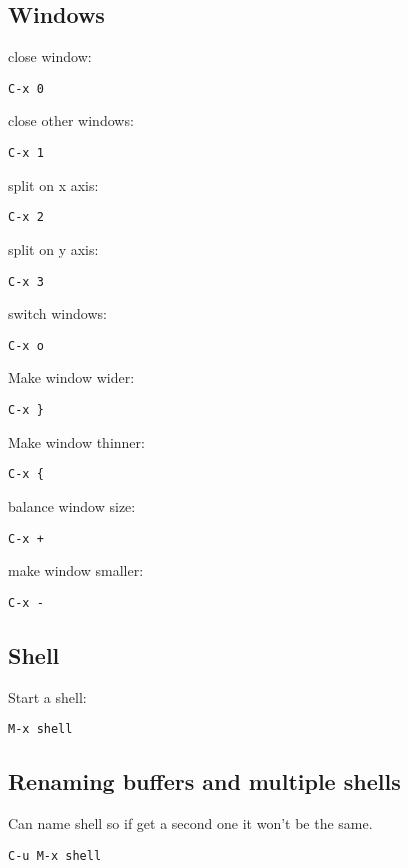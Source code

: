 \subsection{Windows}

close window:
\begin{verbatim}
C-x 0
\end{verbatim}
close other windows:
\begin{verbatim}
C-x 1
\end{verbatim}
split on x axis:
\begin{verbatim}
C-x 2
\end{verbatim}
split on y axis:
\begin{verbatim}
C-x 3
\end{verbatim}
switch windows:
\begin{verbatim}
C-x o
\end{verbatim}
Make window wider:
\begin{verbatim}
C-x }
\end{verbatim}
Make window thinner:
\begin{verbatim}
C-x {
\end{verbatim}
balance window size:
\begin{verbatim}
C-x +
\end{verbatim}
make window smaller:
\begin{verbatim}
C-x -
\end{verbatim}

\subsection{Shell}

Start a shell:

\begin{verbatim}
M-x shell
\end{verbatim}

\subsection{Renaming buffers and multiple shells}

Can name shell so if get a second one it won't be the same.

\begin{verbatim}
C-u M-x shell
\end{verbatim}
